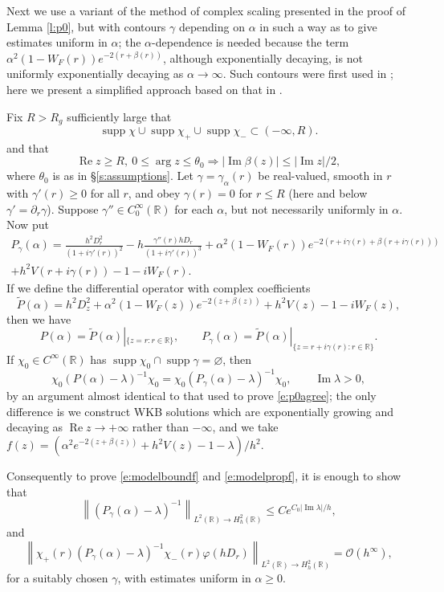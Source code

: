 \documentclass[reqno, 12pt]{amsart}
\newcommand \R {\mathbb{R}}
\newcommand \Oh {\mathcal{O}}
\DeclareMathOperator \re {Re}
\DeclareMathOperator \im {Im}
\DeclareMathOperator \supp {supp}
\theoremstyle{definition}
\numberwithin{equation}{section}
\numberwithin{prop}{section}
\numberwithin{figure}{section}
\begin{document}
Next we use a variant of the method of complex scaling presented in the proof of Lemma \ref{l:p0}, but with contours $\gamma$ depending on $\alpha$ in such a way as to give estimates uniform in $\alpha$; the $\alpha$-dependence is needed because the term $\alpha^2(1-W_F(r))e^{-2(r + \beta(r))}$, although exponentially decaying, is not uniformly exponentially decaying as $\alpha \to \infty$. Such contours were first used in \cite[\S 4]{z}; here we present a simplified approach based on that in \cite[\S 5.2]{Datchev:Thesis}.

Fix $R>R_g$ sufficiently large that
\[
\supp \chi \cup \supp \chi_+ \cup \supp \chi_- \subset(-\infty,R).
\]
and that
\begin{equation}\label{e:betanegf}
\re z \ge R, \ 0 \le \arg z \le \theta_0 \Longrightarrow |\im \beta(z)| \le |\im z|/2,
\end{equation}
where $\theta_0$ is as in \S\ref{s:assumptions}.
Let $\gamma = \gamma_\alpha(r)$ be real-valued, smooth in $r$ with $\gamma'(r)\ge 0$ for all $r$, and obey $\gamma(r) = 0$ for $r \le R$ (here and below $\gamma' = \partial_r \gamma$). Suppose $\gamma'' \in C_0^\infty(\R)$ for each $\alpha$, but not necessarily uniformly in $\alpha$. Now put
\[\begin{split}
P_\gamma(\alpha) = \frac{h^2D_r^2}{(1 + i\gamma'(r))^2} - h \frac{\gamma''(r) h D_r}{(1 + i\gamma'(r))^3}+ \alpha^2(1-W_F(r))e^{-2(r + i \gamma(r) + \beta(r + i \gamma(r)))} \\ + h^2 V(r + i \gamma(r)) - 1 - iW_F(r).
\end{split}\]
If we define the differential operator with complex coefficients
\[\widetilde P(\alpha) = h^2D_z^2 + \alpha^2(1-W_F(z))e^{-2(z + \beta(z))} + h^2 V(z) - 1 - iW_F(z), 
\]
then we have
\[
P(\alpha) = \widetilde P(\alpha)|_{\{z=r: r \in \R\}}, \qquad P_\gamma(\alpha) = \widetilde P(\alpha)|_{\{z=r + i \gamma(r): r \in \R\}}.
\]
If $\chi_0 \in C^\infty(\R)$ has $\supp \chi_0 \cap \supp \gamma = \varnothing$, then
\[
\chi_0(P(\alpha) - \lambda)^{-1} \chi_0 = \chi_0(P_\gamma(\alpha) - \lambda)^{-1} \chi_0, \qquad \im \lambda > 0,
\]
by an argument almost identical to that used to prove \eqref{e:p0agree}; the only difference is we construct WKB solutions which are exponentially growing and decaying as $\re z \to +\infty$ rather than $-\infty$, and we take $
f(z) = (\alpha^2 e^{-2(z + \beta(z))} + h^2 V(z) -1 - \lambda)/h^2.$

Consequently to prove \eqref{e:modelboundf} and \eqref{e:modelpropf}, it is enough to show that
\begin{equation}\label{e:modelboundfg}\left\|(P_\gamma(\alpha) - \lambda)^{-1} \right\|_{L^2(\R) \to H^2_h (\R)} \le C  e^{C_0 |\im \lambda|  /h}, \end{equation}
and
\begin{equation}\label{e:modelpropfg}
\left\|\chi_+(r)(P_\gamma(\alpha) - \lambda)^{-1}\chi_-(r) \varphi(hD_r)\right\|_{L^2(\R) \to H^2_h(\R)} = \Oh(h^\infty),
\end{equation}
for a suitably chosen $\gamma$, with estimates uniform in $\alpha \ge 0$.
\end{document}
